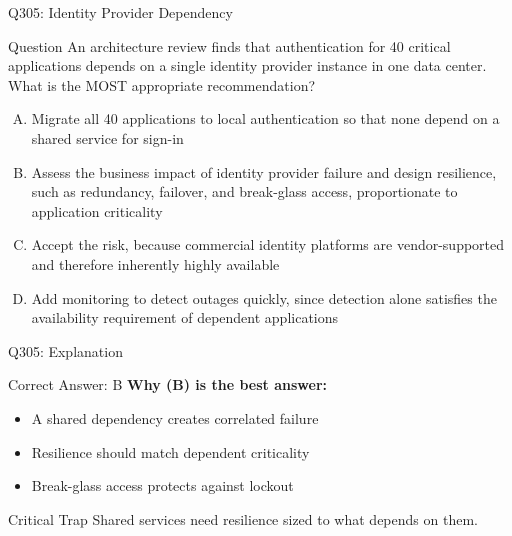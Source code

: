 \documentclass{beamer}
\begin{document}
	\begin{frame}{Q305: Identity Provider Dependency}
		\begin{block}{Question}
			\small An architecture review finds that authentication for 40 critical applications depends on a single identity provider instance in one data center. What is the MOST appropriate recommendation?
		\end{block}
		\begin{enumerate}[(A)]
			\footnotesize
			\item Migrate all 40 applications to local authentication so that none depend on a shared service for sign-in
			\item Assess the business impact of identity provider failure and design resilience, such as redundancy, failover, and break-glass access, proportionate to application criticality
			\item Accept the risk, because commercial identity platforms are vendor-supported and therefore inherently highly available
			\item Add monitoring to detect outages quickly, since detection alone satisfies the availability requirement of dependent applications
		\end{enumerate}
	\end{frame}
	
	\begin{frame}{Q305: Explanation}
		\begin{block}{Correct Answer: B}
			\textbf{Why (B) is the best answer:}
			\begin{itemize}
				\item A shared dependency creates correlated failure
				\item Resilience should match dependent criticality
				\item Break-glass access protects against lockout
			\end{itemize}
		\end{block}
		\begin{alertblock}{Critical Trap}
			Shared services need resilience sized to what depends on them.
		\end{alertblock}
	\end{frame}
	
\end{document}
